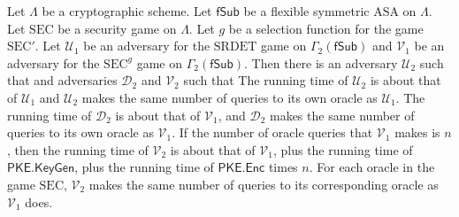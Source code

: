 \begin{theorem} \label{theorem:gen2}
Let $\mathsf{\Lambda}$ be a cryptographic scheme. Let $\mathsf{fSub}$ be a flexible symmetric $\mathrm{ASA}$ on $\mathsf{\Lambda}$. Let $\mathrm{SEC}$ be a security game on $\mathsf{\Lambda}$. Let $g$ be a selection function for the game $\mathrm{SEC}'$. Let $\mathcal{U}_1$ be an adversary for the $\mathrm{SRDET}$ game on $\Gamma_2(\mathsf{fSub})$ and $\mathcal{V}_1$ be an adversary for the $\mathrm{SEC}^g$ game on $\Gamma_2(\mathsf{fSub})$. Then there is an adversary $\mathcal{U}_2$ such that
and adversaries $\mathcal{D}_2$ and $\mathcal{V}_2$ such that
The running time of $\mathcal{U}_2$ is about that of $\mathcal{U}_1$ and $\mathcal{U}_2$ makes the same number of queries to its own oracle as $\mathcal{U}_1$. The running time of $\mathcal{D}_2$ is about that of $\mathcal{V}_1$, and $\mathcal{D}_2$ makes the same number of queries to its own oracle as $\mathcal{V}_1$. If the number of oracle queries that $\mathcal{V}_1$ makes is $n$, then the running time of $\mathcal{V}_2$ is about that of $\mathcal{V}_1$, plus the running time of $\mathsf{PKE.KeyGen}$, plus the running time of $\mathsf{PKE.Enc}$ times $n$. For each oracle in the game $\mathrm{SEC}$, $\mathcal{V}_2$ makes the same number of queries to its corresponding oracle as $\mathcal{V}_1$ does.
\end{theorem}

